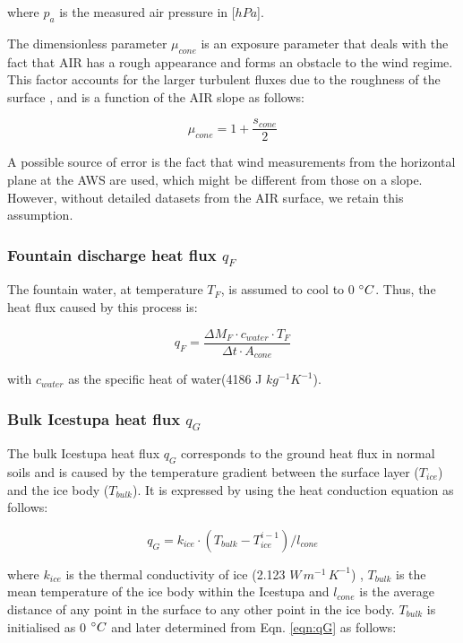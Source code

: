 \documentclass[utf8]{frontiersSCNS}
\begin{document}
where $p_{a}$ is the measured air pressure in [$hPa$].

The dimensionless parameter $\mu_{cone}$ is an exposure parameter that deals with the fact that AIR has a rough
appearance and forms an obstacle to the wind regime. This factor accounts for the larger turbulent fluxes due to
the roughness of the surface \citep{Oerlemans_2021}, and is a function of the AIR slope as follows:

\begin{equation}
	\mu_{cone} = 1 + \frac{s_{cone}}{2}
\end{equation}

A possible source of error is the fact that wind measurements from the horizontal plane at the AWS are used,
which might be different from those on a slope. However, without detailed datasets from the AIR surface, we
retain this assumption.

\subsubsection{Fountain discharge heat flux \texorpdfstring{$q_{F}$}{Lg} }

The fountain water, at temperature $T_F$, is assumed to cool to 0 $\degree C$. Thus, the heat flux caused by this
process is:

\begin{equation}
	q_{F} = \frac{ \Delta M_F \cdot c_{water} \cdot T_F}{\Delta t \cdot A_{cone}}
	\label{eqn:qF}
\end{equation}

with $c_{water}$ as the specific heat of water(4186 J $kg^{-1} K^{-1}$).

\subsubsection{Bulk Icestupa heat flux \texorpdfstring{$q_{G}$}{Lg}} \label{sec:Bulkflux}

The bulk Icestupa heat flux $q_{G}$ corresponds to the ground heat flux in normal soils and is caused by the
temperature gradient between the surface layer ($T_{ice}$) and the ice body ($T_{bulk}$). It is expressed by
using the heat conduction equation as follows:

\begin{equation} q_{G} = k_{ice} \cdot (T_{bulk}-T_{ice}^{i-1})/l_{cone} \label{eqn:qG}    \end{equation}

where $k_{ice}$ is the thermal conductivity of ice (2.123 $W\, m^{-1}\,K^{-1}$) , $T_{bulk}$ is the mean
temperature of the ice body within the Icestupa and $l_{cone}$ is the average distance of any point in the
surface to any other point in the ice body. $T_{bulk}$ is initialised as 0 $\degree C$ and later determined from
Eqn. \ref{eqn:qG} as follows:
\end{document}
